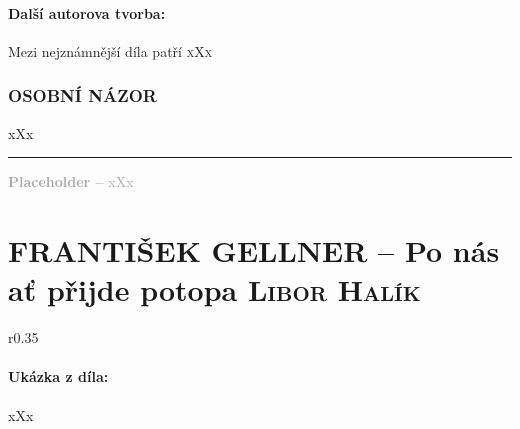 \documentclass[A4paper]{extarticle} %
\begin{document}
\subsection*{Další autorova tvorba:}
\noindent 
Mezi nejznámnější díla patří \textsc{xXx}






\section*{OSOBNÍ NÁZOR}
\noindent 
xXx

\vfill

\noindent\begin{minipage}{\textwidth}
    \textcolor{darkgray}{\rule{\linewidth}{0.4pt}
    \footnotesize
    \textbf{Placeholder --} xXx
    }
\end{minipage}


\newpage


\changefontsize{8pt}

\part*{FRANTIŠEK GELLNER -- Po nás ať přijde potopa {\hfill \normalfont\tiny\textsc{Libor Halík}}}

\noindent\begin{wrapfigure}{r}{0.35\textwidth}
\tiny

\subsection*{Ukázka z díla:}
\setlength{\parindent}{3pt}
xXx
\end{wrapfigure}
\end{document}
